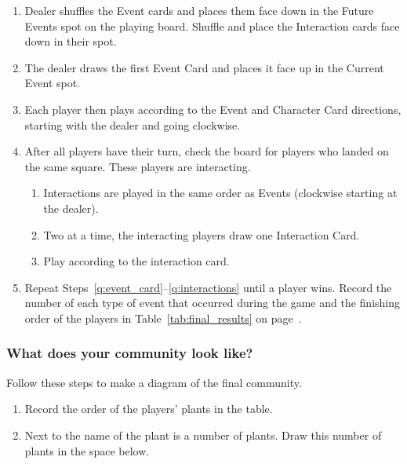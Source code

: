 \documentclass[12pt, hidelinks]{exam}
\begin{document}
\begin{questions}
\begin{enumerate}
	\item Dealer shuffles the Event cards and places them face down in the 
	Future Events spot on the playing board. Shuffle and place the 
	Interaction cards face down in their spot.
	
	\item \label{q:event_card} The dealer draws the first Event Card and places it face 
	up in the Current Event spot.
	
	\item Each player then plays according to the Event and Character 
	Card directions, starting with the dealer and going clockwise.
	
	\item \label{q:interactions} After all players have their turn, check the board for 
	players who landed on the same square. These players are interacting.
	
	\begin{enumerate}[label=(\alph*)]
		\item Interactions are played in the same order as Events (clockwise starting at the dealer).

		\item Two at a time, the interacting players draw one Interaction Card.
		
		\item Play according to the interaction card.
	\end{enumerate}

	\filbreak

	\item Repeat Steps~\ref{q:event_card}–\ref{q:interactions} until a player wins. 
	Record the number of each type of event that occurred during the game and the finishing order of the players in Table~\ref{tab:final_results} on page~\pageref{tab:final_results}.
	
	
\end{enumerate}

\subsubsection*{What does your community look like?}

Follow these steps to make a diagram of the final community.

\begin{enumerate}[resume]
	\item Record the order of the players’ plants in the table.
	
	\item Next to the name of the plant is a number of plants. 
	Draw this number of plants in the space below.
	

\end{enumerate}
\end{questions}
\end{document}
